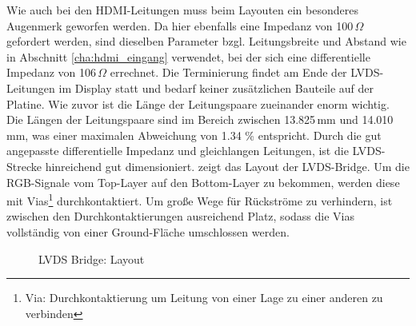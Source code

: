 Wie auch bei den HDMI-Leitungen muss beim Layouten ein besonderes Augenmerk geworfen werden. Da hier ebenfalls eine Impedanz von 100\,$\Omega$ gefordert werden, sind dieselben Parameter bzgl. Leitungsbreite und Abstand wie in Abschnitt \ref{cha:hdmi_eingang} verwendet, bei der sich eine differentielle Impedanz von 106\,$\Omega$ errechnet.  Die Terminierung findet am Ende der LVDS-Leitungen im Display statt und bedarf keiner zusätzlichen Bauteile auf der Platine. Wie zuvor ist die Länge der Leitungspaare zueinander enorm wichtig. Die Längen der Leitungspaare sind im Bereich zwischen 13.825\,mm und 14.010\,mm, was einer maximalen Abweichung von 1.34 \% entspricht. Durch die gut angepasste differentielle Impedanz und gleichlangen Leitungen, ist die LVDS-Strecke hinreichend gut dimensioniert.  zeigt das Layout der LVDS-Bridge. Um die RGB-Signale vom Top-Layer auf den Bottom-Layer zu bekommen, werden diese mit Vias\footnote{Via: Durchkontaktierung um Leitung von einer Lage zu einer anderen zu verbinden} durchkontaktiert. Um große Wege für Rückströme zu verhindern, ist zwischen den Durchkontaktierungen ausreichend Platz, sodass die Vias vollständig von einer Ground-Fläche umschlossen werden.
\begin{figure}[htp]
		\center
        \caption{LVDS Bridge: Layout}
       \label{fig:teilb_lvds_bridge_pcb}
\end{figure}
\newpage
